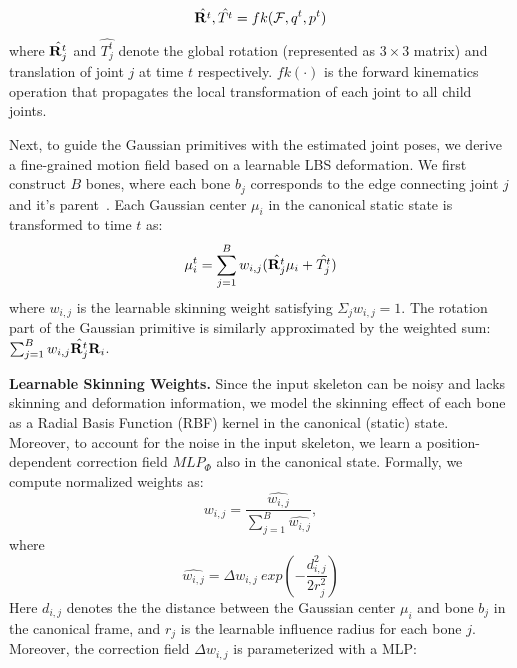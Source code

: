 \begin{equation}
\hat{\mathbf{R}^t}, \hat{T^t} = fk(\mathcal{F}, q^t, p^t)
\end{equation}
where $\hat{\mathbf{R}^t_j}$ and $\hat{T^t_j}$ denote the global rotation (represented as $3\times3$ matrix) and translation of joint $j$ at time $t$ respectively. $fk(\cdot)$ is the forward kinematics operation that propagates the local transformation of each joint to all child joints. 

Next, to guide the Gaussian primitives with the estimated joint poses, we derive a fine-grained motion field based on a learnable LBS deformation. We first construct $B$ bones, where each bone $b_j$ corresponds to the edge connecting joint $j$ and it's parent~\cite{yao2025riggs,uzolas2023template}. 
Each Gaussian center $\mu_i$ in the canonical static state is transformed to time $t$ as:
\begin{equation}
\mu_i^t = \sum_{j=1}^B w_{i,j}(\hat{\mathbf{R}^t_j} \mu_i + \hat{T^t_j})
\end{equation}
where $w_{i,j}$ is the learnable skinning weight satisfying $\Sigma_j w_{i,j} = 1$. The rotation part of the Gaussian primitive is similarly approximated by the weighted sum: $\sum_{j=1}^B w_{i,j}\hat{\mathbf{R}^t_j}\mathbf{R}_i$. 

\par 
\vspace{6pt}
\noindent\textbf{Learnable Skinning Weights.}
Since the input skeleton can be noisy and lacks skinning and deformation information, we model the skinning effect of each bone as a Radial Basis Function (RBF) kernel in the canonical (static) state. Moreover, to account for the noise in the input skeleton, we learn a position-dependent correction field $MLP_{\Phi}$ also in the canonical state. 
Formally, we compute normalized weights as:
\begin{equation}
w_{i,j} = \frac{\hat{w_{i,j}}}{ \sum_{j=1}^B \hat{w_{i,j}}},
\end{equation}
where
\begin{equation}
\hat{w_{i,j}} = \Delta w_{i,j} \ exp\left(- \frac{d_{i,j}^2}{2r_j^2}\right)
\end{equation}
Here $d_{i,j}$ denotes the the distance between the Gaussian center $\mu_i$ and bone $b_j$ in the canonical frame, and $r_j$ is the learnable influence radius for each bone $j$. Moreover, the correction field $\Delta w_{i,j}$ is parameterized with a MLP:

